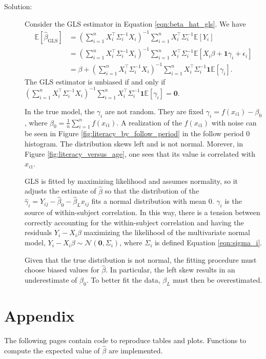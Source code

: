 \documentclass[11pt, letterpaper]{article}
\begin{document}
\begin{enumerate}[(a)]
\begin{description}
\item[Solution:] Consider the GLS estimator in Equation \ref{eqn:beta_hat_gls}. We have
  \begin{align}
    \mathbb{E}\left[\hat{\beta}_{\text{GLS}}\right]
    &=
    \left(\sum_{i=1}^nX_i^\intercal \Sigma_i^{-1}X_i\right)^{-1}
      \sum_{i=1}^n X_i^\intercal\Sigma_i^{-1}\mathbb{E}\left[Y_i\right] \\
    &= \left(\sum_{i=1}^nX_i^\intercal \Sigma_i^{-1}X_i\right)^{-1}
      \sum_{i=1}^n X_i^\intercal\Sigma_i^{-1}\mathbb{E}\left[X_i\beta + \mathbf{1}\gamma_i + \epsilon_i\right] \nonumber\\
    &= \beta + \left(\sum_{i=1}^nX_i^\intercal \Sigma_i^{-1}X_i\right)^{-1}
      \sum_{i=1}^n X_i^\intercal\Sigma_i^{-1}\mathbf{1}\mathbb{E}\left[\gamma_i\right]. \nonumber
  \end{align}
  The GLS estimator is unbiased if and only if
  $\left(\sum_{i=1}^nX_i^\intercal \Sigma_i^{-1}X_i\right)^{-1}\sum_{i=1}^n
  X_i^\intercal\Sigma_i^{-1}\mathbf{1}\mathbb{E}\left[\gamma_i\right] =
  \mathbf{0}$.

  In the true model, the $\gamma_i$ are not random. They are fixed
  $\gamma_i = f\left(x_{i1}\right) - \beta_0$, where
  $\beta_0 = \frac{1}{n}\sum_{i=1}^nf\left(x_{i1}\right)$. A realization of the
  $f\left(x_{i1}\right)$ with noise can be seen in Figure
  \ref{fig:literacy_by_follow_period} in the follow period $0$ histogram. The
  distribution skews left and is not normal. Morever, in Figure
  \ref{fig:literacy_versus_age}, one sees that its value is correlated with
  $x_{i1}$.

  GLS is fitted by maximizing likelihood and assumes normality, so it adjusts
  the estimate of $\hat{\beta}$ so that the distribution of the
  $\hat{\gamma}_{i} = Y_{ij} - \hat{\beta}_0 - \hat{\beta}_{L}x_{ij}$ fits a
  normal distribution with mean $0$. $\gamma_i$ is the source of within-subject
  correlation. In this way, there is a tension between correctly accounting for
  the within-subject correlation and having the residuals $Y_{i} - X_{i}\beta$
  maximizing the likelihood of the multivariate normal model,
  $Y_i - X_{i}\beta \sim \mathcal{N}\left(\mathbf{0}, \Sigma_i\right)$, where
  $\Sigma_i$ is defined Equation \ref{eqn:sigma_i}.

  Given that the true distribution is not normal, the fitting procedure must
  choose biased values for $\hat{\beta}$. In particular, the left skew results
  in an underestimate of $\beta_0$. To better fit the data, $\beta_L$ must then
  be overestimated.
\end{description}
\end{enumerate}

\section*{Appendix}

The following pages contain code to reproduce tables and plots. Functions to
compute the expected value of $\hat{\beta}$ are implemented.
\clearpage

\end{document}
